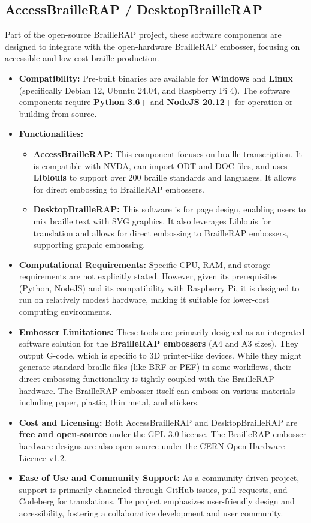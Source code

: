 \subsection{AccessBrailleRAP / DesktopBrailleRAP}
Part of the open-source BrailleRAP project, these software components are designed to integrate with the open-hardware BrailleRAP embosser, focusing on accessible and low-cost braille production.

\begin{itemize}
\item \textbf{Compatibility:} Pre-built binaries are available for \textbf{Windows} and \textbf{Linux} (specifically Debian 12, Ubuntu 24.04, and Raspberry Pi 4). The software components require \textbf{Python 3.6+} and \textbf{NodeJS 20.12+} for operation or building from source\footnotemark[10].
\item \textbf{Functionalities:}
\begin{itemize}
\item \textbf{AccessBrailleRAP:} This component focuses on braille transcription. It is compatible with NVDA, can import ODT and DOC files, and uses \textbf{Liblouis} to support over 200 braille standards and languages. It allows for direct embossing to BrailleRAP embossers\footnotemark[11].
\item \textbf{DesktopBrailleRAP:} This software is for page design, enabling users to mix braille text with SVG graphics. It also leverages Liblouis for translation and allows for direct embossing to BrailleRAP embossers, supporting graphic embossing\footnotemark[11].
\end{itemize}
\item \textbf{Computational Requirements:} Specific CPU, RAM, and storage requirements are not explicitly stated. However, given its prerequisites (Python, NodeJS) and its compatibility with Raspberry Pi, it is designed to run on relatively modest hardware, making it suitable for lower-cost computing environments.
\item \textbf{Embosser Limitations:} These tools are primarily designed as an integrated software solution for the \textbf{BrailleRAP embossers} (A4 and A3 sizes)\footnotemark[11]. They output G-code, which is specific to 3D printer-like devices. While they might generate standard braille files (like BRF or PEF) in some workflows, their direct embossing functionality is tightly coupled with the BrailleRAP hardware. The BrailleRAP embosser itself can emboss on various materials including paper, plastic, thin metal, and stickers\footnotemark[11].
\item \textbf{Cost and Licensing:} Both AccessBrailleRAP and DesktopBrailleRAP are \textbf{free and open-source} under the GPL-3.0 license. The BrailleRAP embosser hardware designs are also open-source under the CERN Open Hardware Licence v1.2\footnotemark[11].
\item \textbf{Ease of Use and Community Support:} As a community-driven project, support is primarily channeled through GitHub issues, pull requests, and Codeberg for translations. The project emphasizes user-friendly design and accessibility, fostering a collaborative development and user community\footnotemark[10].
\end{itemize}

